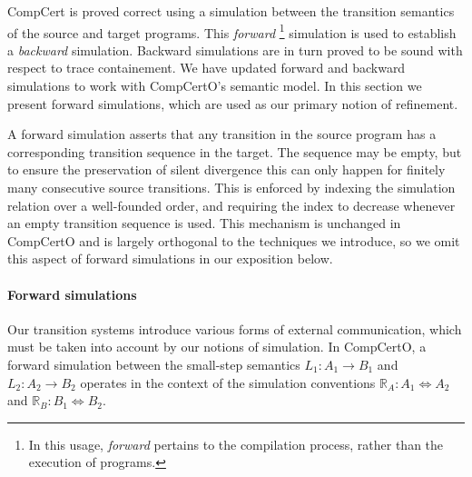 \documentclass[11pt,oneside,draft]{book}
\theoremstyle{definition}
\newcommand{\kw}[1]{\ensuremath{ \mathsf{#1} }}
\begin{document}
CompCert is proved correct using a simulation
between the transition semantics of the source and target programs.
This \emph{forward}%
\footnote{In this usage, \emph{forward} pertains to
  the compilation process,
  rather than the execution of programs.}
simulation is used to establish a \emph{backward} simulation.
Backward simulations
are in turn proved to be sound with respect to trace containement.
We have updated forward and backward simulations to
work with CompCertO's semantic model.
In this section we present forward simulations,
which are used as our primary notion of refinement.


A forward simulation asserts that any transition in the source program
has a corresponding transition sequence in the target.
The sequence may be empty,
but to ensure the preservation of silent divergence
this can only happen for finitely many consecutive source transitions.
This is enforced by indexing the simulation relation
over a well-founded order,
and requiring the index to decrease
whenever an empty transition sequence is used.
This mechanism is unchanged in CompCertO
and is largely orthogonal to the techniques we introduce,
so we omit this aspect of forward simulations
in our exposition below.

\paragraph{Forward simulations} %

Our transition systems introduce
various forms of external communication,
which must be taken into account by our notions of simulation.
In CompCertO,
a forward simulation between the small-step semantics
$L_1 : A_1 \rightarrow B_1$ and
$L_2 : A_2 \rightarrow B_2$
operates in the context of the simulation conventions
$\mathbb{R}_A : A_1 \Leftrightarrow A_2$ and
$\mathbb{R}_B : B_1 \Leftrightarrow B_2$.
\end{document}
